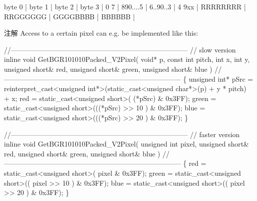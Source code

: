 \begin{Desc}
\begin{description}
\begin{DoxyCode}
byte 0   | byte 1   | byte 2   | byte 3   |
0      7 | 890....5 | 6..90..3 | 4    9xx |
RRRRRRRR | RRGGGGGG | GGGGBBBB | BBBBBB   |
\end{DoxyCode}


\begin{DoxyNote}{注解}
Access to a certain pixel can e.\+g. be implemented like this\+:
\end{DoxyNote}

\begin{DoxyCode}
\textcolor{comment}{//-----------------------------------------------------------------------------}
\textcolor{comment}{// slow version}
\textcolor{keyword}{inline} \textcolor{keywordtype}{void} GetBGR101010Packed\_V2Pixel( \textcolor{keywordtype}{void}* p, \textcolor{keyword}{const} \textcolor{keywordtype}{int} pitch, \textcolor{keywordtype}{int} x, \textcolor{keywordtype}{int} y, \textcolor{keywordtype}{unsigned} \textcolor{keywordtype}{short}& red, \textcolor{keywordtype}{
      unsigned} \textcolor{keywordtype}{short}& green, \textcolor{keywordtype}{unsigned} \textcolor{keywordtype}{short}& blue )
\textcolor{comment}{//-----------------------------------------------------------------------------}
\{
  \textcolor{keywordtype}{unsigned} \textcolor{keywordtype}{int}* pSrc = \textcolor{keyword}{reinterpret\_cast<}\textcolor{keywordtype}{unsigned} \textcolor{keywordtype}{int}*\textcolor{keyword}{>}(\textcolor{keyword}{static\_cast<}\textcolor{keywordtype}{unsigned} \textcolor{keywordtype}{char}*\textcolor{keyword}{>}(p) + y * pitch) + x;
  red   = \textcolor{keyword}{static\_cast<}\textcolor{keywordtype}{unsigned} \textcolor{keywordtype}{short}\textcolor{keyword}{>}( (*pSrc)         & 0x3FF);
  green = \textcolor{keyword}{static\_cast<}\textcolor{keywordtype}{unsigned} \textcolor{keywordtype}{short}\textcolor{keyword}{>}(((*pSrc) >> 10 ) & 0x3FF);
  blue  = \textcolor{keyword}{static\_cast<}\textcolor{keywordtype}{unsigned} \textcolor{keywordtype}{short}\textcolor{keyword}{>}(((*pSrc) >> 20 ) & 0x3FF);
\}

\textcolor{comment}{//-----------------------------------------------------------------------------}
\textcolor{comment}{// faster version}
\textcolor{keyword}{inline} \textcolor{keywordtype}{void} GetBGR101010Packed\_V2Pixel( \textcolor{keywordtype}{unsigned} \textcolor{keywordtype}{int} pixel, \textcolor{keywordtype}{unsigned} \textcolor{keywordtype}{short}& red, \textcolor{keywordtype}{unsigned} \textcolor{keywordtype}{short}& green, \textcolor{keywordtype}{
      unsigned} \textcolor{keywordtype}{short}& blue )
\textcolor{comment}{//-----------------------------------------------------------------------------}
\{
  red   = \textcolor{keyword}{static\_cast<}\textcolor{keywordtype}{unsigned} \textcolor{keywordtype}{short}\textcolor{keyword}{>}(  pixel         & 0x3FF);
  green = \textcolor{keyword}{static\_cast<}\textcolor{keywordtype}{unsigned} \textcolor{keywordtype}{short}\textcolor{keyword}{>}(( pixel >> 10 ) & 0x3FF);
  blue  = \textcolor{keyword}{static\_cast<}\textcolor{keywordtype}{unsigned} \textcolor{keywordtype}{short}\textcolor{keyword}{>}(( pixel >> 20 ) & 0x3FF);
\}
\end{DoxyCode}



\end{description}
\end{Desc}
